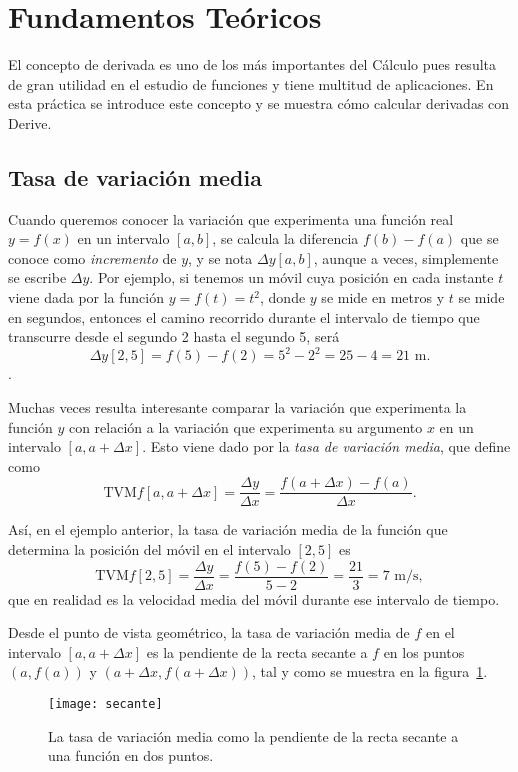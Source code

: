 \documentclass[a4paper]{article}
\begin{document}
\sloppy
{}

\bigskip
\section*{Fundamentos Teóricos}
El concepto de derivada es uno de los más importantes del Cálculo pues resulta
de gran utilidad en el estudio de funciones y tiene multitud de aplicaciones.
En esta práctica se introduce este concepto y se muestra cómo calcular derivadas con Derive.

\subsection*{Tasa de variación media}
Cuando queremos conocer la variación que experimenta una función real $y=f(x)$ en un intervalo $[a,b]$, se calcula la diferencia $f(b)-f(a)$ que se conoce como \emph{incremento} de $y$, y se nota $\Delta y[a,b]$, aunque a veces, simplemente se escribe $\Delta y$. Por ejemplo, si tenemos un móvil cuya posición en cada instante $t$ viene dada por la función $y=f(t)=t^2$, donde $y$ se mide en metros y $t$ se mide en segundos, entonces el camino recorrido durante el intervalo de tiempo que transcurre desde el segundo 2 hasta el segundo 5, será 
\[\Delta y[2,5]=f(5)-f(2)=5^2-2^2=25-4=21 \textrm{ m}.\].

Muchas veces resulta interesante comparar la variación que experimenta la función $y$ con relación a la variación que experimenta su argumento $x$ en un intervalo $[a,a+\Delta x]$. Esto viene dado por la \emph{tasa de variación media}, que define como
\[
\textrm{TVM} f[a,a+\Delta x]=\frac{\Delta y}{\Delta x}=\frac{f(a+\Delta x)-f(a)}{\Delta x}.
\]

Así, en el ejemplo anterior, la tasa de variación media de la función que determina la posición del móvil en el intervalo $[2,5]$ es
\[\textrm{TVM} f[2,5]=\frac{\Delta y}{\Delta x}=\frac{f(5)-f(2)}{5-2}=\frac{21}{3}=7\textrm{ m/s},\]
que en realidad es la velocidad media del móvil durante ese intervalo de tiempo.

Desde el punto de vista geométrico, la tasa de variación media de $f$ en el intervalo $[a , a+\Delta x]$ es la pendiente de la recta secante a $f$ en los puntos $(a , f(a))$ y $(a+\Delta x, f(a+\Delta x))$, tal y como se muestra en la figura~\ref{g:secante}.

\begin{figure}[h!]
\begin{center}
\texttt{[image: secante]}
\caption{La tasa de variación media como la pendiente de la 
recta secante a una función en dos puntos.}
\label{g:secante}
\end{center}
\end{figure}
\end{document}
